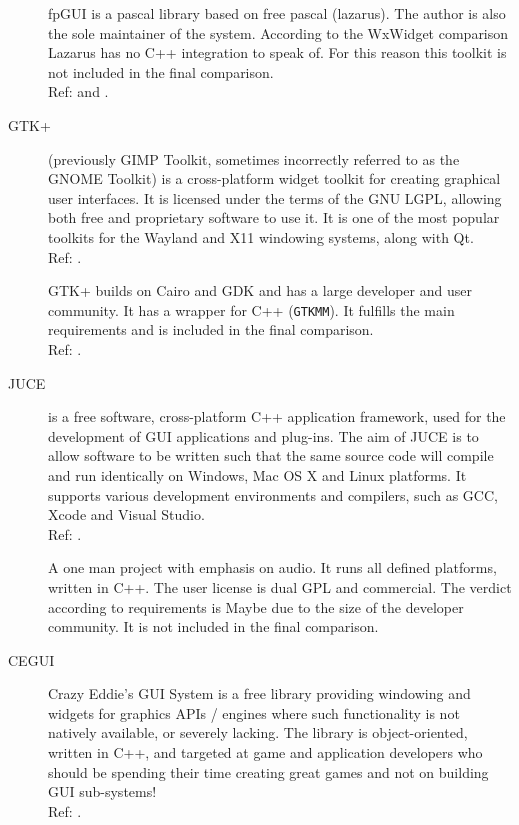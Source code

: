 \begin{description}
		fpGUI is a pascal library based on free pascal (lazarus).  The author
		is also the sole maintainer of the system. According to the WxWidget
		comparison Lazarus has no C++ integration to speak of. For this reason
		this toolkit is not included in the final comparison.
		\hspace*{\fill}\\Ref: \cite{Geldenhuys:fpgui} and
		\cite{wxwidget:comparison}.

	\item[GTK+] (previously GIMP Toolkit, sometimes incorrectly referred to as
		the GNOME Toolkit) is a cross-platform widget toolkit for creating
		graphical user interfaces. It is licensed under the terms of the GNU
		LGPL, allowing both free and proprietary software to use it. It is one
		of the most popular toolkits for the Wayland and X11 windowing systems,
		along with Qt.  \hspace*{\fill}\\Ref: \cite{wiki:gtk+}.

		GTK+ builds on Cairo and GDK and has a large developer and user
		community.  It has a wrapper for C++ (\verb!GTKMM!). It fulfills the
		main requirements and is included in the final comparison.
		\hspace*{\fill}\\Ref: \cite{gtkmm:gtk+}.

    \item[JUCE] is a free software, cross-platform C++ application framework, used
		for the development of GUI applications and plug-ins.
		The aim of JUCE is to allow software to be written such that
		the same source code will compile and run identically on Windows,
		Mac OS X and Linux platforms. It supports various development
		environments and compilers, such as GCC, Xcode and Visual Studio.
		\hspace*{\fill}\\Ref: \cite{wiki:juce}.

		A one man project with emphasis on audio.  It runs all defined
		platforms, written in C++. The user license is dual GPL and commercial.
		The verdict according to requirements is Maybe due to the size of the
		developer community. It is not included in the final comparison.

	\item[CEGUI] Crazy Eddie's GUI System is a free library providing windowing
		and widgets for graphics APIs / engines where such functionality is not
		natively available, or severely lacking. The library is
		object-oriented, written in C++, and targeted at game and application
		developers who should be spending their time creating great games and
		not on building GUI sub-systems!
		\hspace*{\fill}\\Ref: \cite{cegui:getting-started}.


\end{description}
